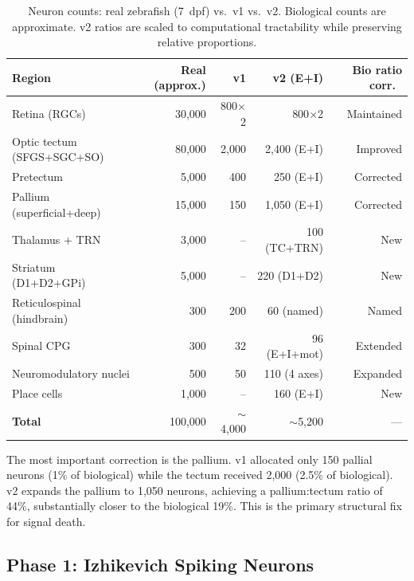 \documentclass[11pt,a4paper]{article}
\begin{document}
\begin{table}[H]
\centering
\caption{Neuron counts: real zebrafish (7~dpf) vs.\ v1 vs.\ v2.
  Biological counts are approximate. v2 ratios are scaled to
  computational tractability while preserving relative proportions.}
\label{tab:counts}
\begin{tabular}{lrrrr}
\toprule
Region & Real (approx.) & v1 & v2 (E+I) & Bio ratio corr.\ \\
\midrule
Retina (RGCs)               & 30,000  & 800$\times$2 & 800$\times$2   & Maintained \\
Optic tectum (SFGS+SGC+SO)  & 80,000  & 2,000        & 2,400 (E+I)    & Improved \\
Pretectum                   &  5,000  &   400        &   250 (E+I)    & Corrected \\
Pallium (superficial+deep)  & 15,000  &   150        & 1,050 (E+I)    & Corrected \\
Thalamus + TRN              &  3,000  &    --        &   100 (TC+TRN) & New \\
Striatum (D1+D2+GPi)        &  5,000  &    --        &   220 (D1+D2)  & New \\
Reticulospinal (hindbrain)  &    300  &   200        &    60 (named)  & Named \\
Spinal CPG                  &    300  &    32        &    96 (E+I+mot)& Extended \\
Neuromodulatory nuclei      &    500  &    50        &   110 (4 axes) & Expanded \\
Place cells                 &  1,000  &    --        &   160 (E+I)    & New \\
\midrule
\textbf{Total}              & 100,000 & $\sim$4,000  & $\sim$5,200    & --- \\
\bottomrule
\end{tabular}
\end{table}

The most important correction is the pallium.
v1 allocated only 150 pallial neurons (1\% of biological) while the
tectum received 2,000 (2.5\% of biological).
v2 expands the pallium to 1,050 neurons, achieving a pallium:tectum
ratio of 44\%, substantially closer to the biological 19\%.
This is the primary structural fix for signal death.

\subsection{Phase 1: Izhikevich Spiking Neurons}\label{sec:phase1}
\end{document}
